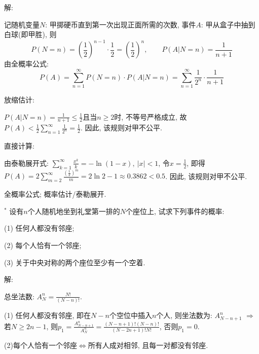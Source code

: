 \documentclass[standard]{ExBook}
\begin{document}
\begin{qitems}
\vspace{-5em}

    \begin{bbox}
解:

记随机变量$N$: 甲掷硬币直到第一次出现正面所需的次数, 事件$A$: 甲从盒子中抽到白球(即甲胜), 则
$$P(N=n)=(\frac{1}{2})^{n-1}\cdot\frac{1}{2}=(\frac{1}{2})^{n},\qquad P(A|N=n)=\frac{1}{n+1}$$
由全概率公式:
$$P(A)=\sum\limits_{n=1}^{\infty}P(N=n)\cdot P(A|N=n)=\sum\limits_{n=1}^{\infty}\frac{1}{2^n}\cdot\frac{1}{n+1}$$

 放缩估计: 

$P(A|N=n)=\frac{1}{n+1} \leq \frac{1}{2}$且当$n \geq 2$时, 不等号严格成立, 故$P(A) < \frac{1}{2}\sum\limits_{n=1}^{\infty}\frac{1}{2^n}=\frac{1}{2}$. 因此, 该规则对甲不公平.

 直接计算:

由泰勒展开式: $\sum\limits_{k=1}^{\infty}\frac{x^k}{k}=-\ln(1-x),\ |x|<1$, 令$x=\frac{1}{2}$, 即得$P(A)=2\sum\limits_{m=2}^{\infty}\frac{(\frac{1}{2})^m}{m}=2\ln2-1\approx0.3862<0.5$. 因此, 该规则对甲不公平.

\textcolor{themeColor}{\selectfont {} 全概率公式; 概率估计/泰勒展开.}
    \end{bbox}

\vspace{-5em}

    \begin{bbox}
    \begin{shaded}
        \qitem$^*$
设有$n$个人随机地坐到礼堂第一排的$N$个座位上, 试求下列事件的概率:

(1) 任何人都没有邻座;

(2) 每个人恰有一个邻座;

(3) 关于中央对称的两个座位至少有一个空着.
    \end{shaded}
    \end{bbox}

\vspace{-5em}

    \begin{bbox}
解:

总坐法数: $A_{N}^{n}=\frac{N!}{(N-n)!}$.

(1) 任何人都没有邻座, 即在$N-n$个空位中插入$n$个人, 则坐法数为: $A_{N-n+1}^{n}$ $\Longrightarrow$ 若$N \geq 2n-1$, 则$p_{1}=\frac{A_{N-n+1}^{n}}{A_{N}^{n}}=\frac{(N-n+1)!(N-n)!}{(N-2n+1)!N!}$, 否则$p_{1}=0$.

(2)每个人恰有一个邻座$\Longleftrightarrow$所有人成对相邻, 且每一对都没有邻座.


\end{bbox}
\end{qitems}
\end{document}
